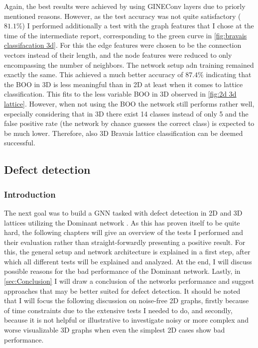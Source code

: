 \documentclass[11pt,a4paper]{article}
\begin{document}
Again, the best results were achieved by using GINEConv layers due to priorly mentioned reasons. 
However, as the test accuracy was not quite satisfactory ($81.1\%$) I performed additionally a test with the graph features that I chose at the time of the intermediate report, corresponding to the green curve in \autoref{fig:bravais classifacation 3d}. 
For this the edge features were chosen to be the connection vectors instead of their length, and the node features were reduced to only encompassing the number of neighbors. 
The network setup adn training remained exactly the same. 
This achieved a much better accuracy of $87.4\%$ indicating that the BOO in 3D is less meaningful than in 2D at least when it comes to lattice classification. 
This fits to the less variable BOO in 3D observed in \autoref{fig:2d 3d lattice}. 
However, when not using the BOO the network still performs rather well, especially considering that in 3D there exist 14 classes instead of only 5 and the false positive rate (the network by chance guesses the correct class) is expected to be much lower. 
Therefore, also 3D Bravais lattice classification can be deemed successful. 

\subsection{Defect detection}
\label{ssec:Defect detection}
\subsubsection{Introduction}
The next goal was to build a GNN tasked with defect detection in 2D and 3D lattices utilizing the Dominant network \cite{dingDeepAnomalyDetection2019}. 
As this has proven itself to be quite hard, the following chapters will give an overview of the tests I performed and their evaluation rather than straight-forwardly presenting a positive result. 
For this, the general setup and network architecture is explained in a first step, after which all different tests will be explained and analyzed. 
At the end, I will discuss possible reasons for the bad performance of the Dominant network.
Lastly, in \autoref{sec:Conclusion} I will draw a conclusion of the networks performance and suggest approaches that may be better suited for defect detection. 
It should be noted that I will focus the following discussion on noise-free 2D graphs, firstly because of time constraints due to the extensive tests I needed to do, and secondly, because it is not helpful or illustrative to investigate noisy or more complex and worse visualizable 3D graphs when even the simplest 2D cases show bad performance. \\
\end{document}
